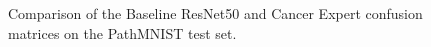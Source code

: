 \begin{figure}[htbp]
    \centering
    
    \caption{Comparison of the Baseline ResNet50 and Cancer Expert confusion
    matrices on the PathMNIST test set.}
    \label{fig:resnet50-cancer-expert-confusion-comparison}
\end{figure}
